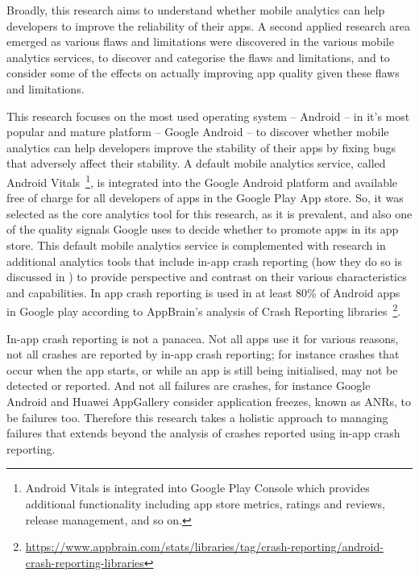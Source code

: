 Broadly, this research aims to understand whether mobile analytics can help developers to improve the reliability of their apps. A second applied research area emerged as various flaws and limitations were discovered in the various mobile analytics services, to discover and categorise the flaws and limitations, and to consider some of the effects on actually improving app quality given these flaws and limitations. 

This research focuses on the most used operating system -- Android -- in it's most popular and mature platform -- Google Android -- to discover whether mobile analytics can help developers improve the stability of their apps by fixing bugs that adversely affect their stability. A default mobile analytics service, called Android Vitals~\footnote{Android Vitals is integrated into Google Play Console which provides additional functionality including app store metrics, ratings and reviews, release management, and so on.}, is integrated into the Google Android platform and available free of charge for all developers of apps in the Google Play App store. So, it was selected as the core analytics tool for this research, as it is prevalent, and also one of the quality signals Google uses to decide whether to promote apps in its app store. This default mobile analytics service is complemented with research in additional analytics tools that include in-app crash reporting (how they do so is discussed in \href{{app:crash-recording-and-reporting-in-android}}{}) to provide perspective and contrast on their various characteristics and capabilities. In app crash reporting is used in at least 80\% of Android apps in Google play according to AppBrain's analysis of Crash Reporting libraries~\footnote{\url{https://www.appbrain.com/stats/libraries/tag/crash-reporting/android-crash-reporting-libraries}}.


In-app crash reporting is not a panacea. Not all apps use it for various reasons, not all crashes are reported by in-app crash reporting; for instance crashes that occur when the app starts, or while an app is still being initialised, may not be detected or reported. And not all failures are crashes, for instance Google Android and Huawei AppGallery consider application freezes, known as ANRs, to be failures too. Therefore this research takes a holistic approach to managing failures that extends beyond the analysis of crashes reported using in-app crash reporting.   %

